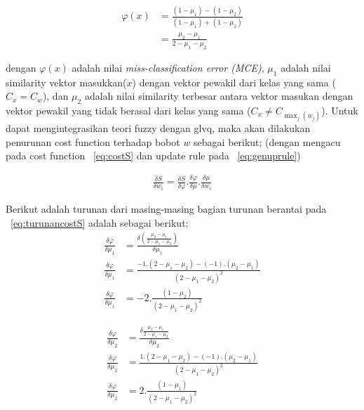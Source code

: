 \begin{align}
\label{eq:}
	\varphi(x) &= \frac{(1 - \mu_1) - (1 - \mu_2)}{(1 - \mu_1) + (1 -
	\mu_2)}\nonumber\\
	&= \frac{\mu_2 - \mu_1}{2 - \mu_1 - \mu_2}
\end{align}

dengan $\varphi(x)$ adalah nilai \emph{miss-classification error (MCE)},
$\mu_1$ adalah nilai similarity vektor masukkan($x$) dengan vektor pewakil dari
kelas yang sama ($C_x = C_w$), dan $\mu_2$ adalah nilai similarity
terbesar antara vektor masukan dengan vektor pewakil yang tidak berasal dari
kelas yang sama ($C_x \neq C_{\max_{j}(w_j)}$).  Untuk dapat mengintegrasikan
teori fuzzy dengan \gls{glvq}, maka akan dilakukan penurunan  cost function
terhadap bobot $w$ sebagai berikut; (dengan mengacu pada cost function
\equ~\ref{eq:costS} dan update rule pada \equ~\ref{eq:genuprule})

\begin{align}
\label{eq:turunancostS}
	\frac{\delta S}{\delta w_i} =  
	\frac{\delta S}{\delta \varphi} . \frac{\delta \varphi}{\delta \mu}.
	\frac{\delta \mu}{\delta w_i}
\end{align}


\noindent Berikut adalah turunan dari masing-masing bagian turunan berantai pada
\equ~\ref{eq:turunancostS} adalah sebagai berikut; 
\begin{align}
\label{eq:turunanmce1}
	\frac{\delta \varphi}{\delta \mu_1} &= 
	\frac{\delta \left(\frac{\mu_2-\mu_1}{2-\mu_1-\mu_2}\right)}{\delta \mu_1} 
	\nonumber \\ \frac{\delta \varphi}{\delta \mu_1} &=  
	\frac{-1 . (2 - \mu_1 - \mu_2) - (-1).(\mu_2-\mu_1)}
	{(2 - \mu_1 - \mu_2)^2} \nonumber \\
	\frac{\delta \varphi}{\delta \mu_1} &=  
	-2.\frac{(1 - \mu_2)}{(2 - \mu_1 - \mu_2)^2}
\end{align}

\begin{align}
\label{eq:turunanmce2}
	\frac{\delta \varphi}{\delta \mu_2} &= 
	\frac{\delta \frac{\mu_2-\mu_1}{2-\mu_1-\mu_2}}{\delta \mu_2}  \nonumber \\
	\frac{\delta \varphi}{\delta \mu_2} &=  
	\frac{1 . (2 - \mu_1 - \mu_2) - (-1).(\mu_2-\mu_1)}
	{(2 - \mu_1 - \mu_2)^2} \nonumber \\
	\frac{\delta \varphi}{\delta \mu_2} &=  
	2.\frac{(1 - \mu_1)}{(2 - \mu_1 - \mu_2)^2}
\end{align}

